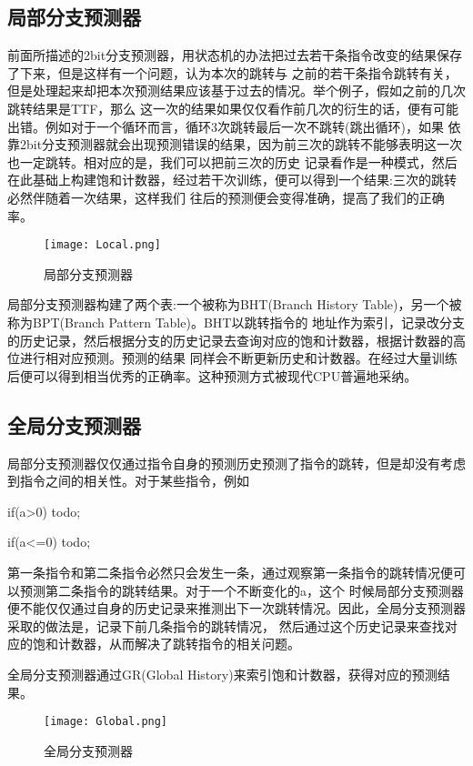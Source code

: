 \documentclass[forprint]{WHUBachelor}
\begin{document}
 \subsection{局部分支预测器}
 前面所描述的2bit分支预测器，用状态机的办法把过去若干条指令改变的结果保存了下来，但是这样有一个问题，认为本次的跳转与
 之前的若干条指令跳转有关，但是处理起来却把本次预测结果应该基于过去的情况。举个例子，假如之前的几次跳转结果是TTF，那么
 这一次的结果如果仅仅看作前几次的衍生的话，便有可能出错。例如对于一个循环而言，循环3次跳转最后一次不跳转(跳出循环)，如果
 依靠2bit分支预测器就会出现预测错误的结果，因为前三次的跳转不能够表明这一次也一定跳转。相对应的是，我们可以把前三次的历史
 记录看作是一种模式，然后在此基础上构建饱和计数器，经过若干次训练，便可以得到一个结果:三次的跳转必然伴随着一次结果，这样我们
 往后的预测便会变得准确，提高了我们的正确率。\par
 \begin{figure}[ht]
  \centering
    \texttt{[image: Local.png]}
    \caption{局部分支预测器}
    \label{fig:3}
  \end{figure}
 局部分支预测器构建了两个表:一个被称为BHT(Branch History Table)，另一个被称为BPT(Branch Pattern Table)。BHT以跳转指令的
 地址作为索引，记录改分支的历史记录，然后根据分支的历史记录去查询对应的饱和计数器，根据计数器的高位进行相对应预测。预测的结果
 同样会不断更新历史和计数器。在经过大量训练后便可以得到相当优秀的正确率。这种预测方式被现代CPU普遍地采纳。

 \subsection{全局分支预测器}
 局部分支预测器仅仅通过指令自身的预测历史预测了指令的跳转，但是却没有考虑到指令之间的相关性。对于某些指令，例如\par
 if(a>0) todo;\par
if(a<=0) todo;\par
第一条指令和第二条指令必然只会发生一条，通过观察第一条指令的跳转情况便可以预测第二条指令的跳转结果。对于一个不断变化的a，这个
时候局部分支预测器便不能仅仅通过自身的历史记录来推测出下一次跳转情况。因此，全局分支预测器采取的做法是，记录下前几条指令的跳转情况，
然后通过这个历史记录来查找对应的饱和计数器，从而解决了跳转指令的相关问题。\par
全局分支预测器通过GR(Global History)来索引饱和计数器，获得对应的预测结果。\par
\begin{figure}[ht]
  \centering
    \texttt{[image: Global.png]}
    \caption{全局分支预测器}
    \label{fig:3}
  \end{figure}
\end{document}
